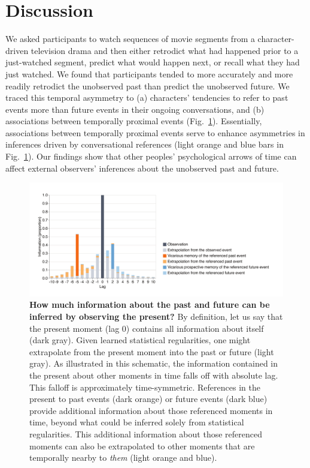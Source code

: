 \documentclass[10pt]{article}
\begin{document}
\section*{Discussion}
We asked participants to watch sequences of movie segments from a character-driven television drama and then either retrodict what had happened prior to a just-watched segment, predict what would happen next, or recall what they had just watched. We found that participants tended to more accurately and more readily retrodict the unobserved past than predict the unobserved future.  We traced this temporal asymmetry to (a) characters' tendencies to refer to past events more than future events in their ongoing conversations, and (b) associations between temporally proximal events (Fig.~\ref{fig:discussion}). Essentially, associations between temporally proximal events serve to enhance asymmetries in inferences driven by conversational references (light orange and blue bars in Fig.~\ref{fig:discussion}). Our findings show that other peoples' psychological arrows of time can affect external observers' inferences about the unobserved past and future.

\begin{figure}[tp]
  \centering
  \includegraphics[width=\textwidth]{discussion}
  \caption{\textbf{How much information about the past and future can be inferred by observing the present?}  By definition, let us say that the present moment (lag 0) contains all information about itself (dark gray).  Given learned statistical regularities, one might extrapolate from the present moment into the past or future (light gray).  As illustrated in this schematic, the information contained in the present about other moments in time falls off with absolute lag.  This falloff is approximately time-symmetric.  References in the present to past events (dark orange) or future events (dark blue) provide additional information about those referenced moments in time, beyond what could be inferred solely from statistical regularities.  This additional information about those referenced moments can also be extrapolated to other moments that are temporally nearby to \textit{them} (light orange and blue).}
  \label{fig:discussion}
\end{figure}
\end{document}
